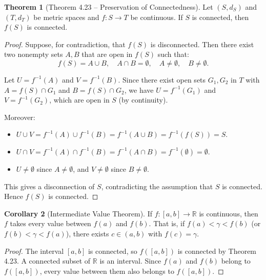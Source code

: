 \documentclass[12pt,a4paper]{article}
\theoremstyle{definition}
\newtheorem{theorem}{Theorem}[section]
\newtheorem{corollary}[theorem]{Corollary}
\newcommand{\R}{\mathbb{R}}
\begin{document}
\begin{theorem}[Theorem 4.23 -- Preservation of Connectedness]
Let $(S, d_S)$ and $(T, d_T)$ be metric spaces and $f: S \to T$ be continuous. If $S$ is connected, then $f(S)$ is connected.
\end{theorem}

\begin{proof}
Suppose, for contradiction, that $f(S)$ is disconnected. Then there exist two nonempty sets $A, B$ that are open in $f(S)$ such that:
\[
    f(S) = A \cup B, \quad A \cap B = \emptyset, \quad A \neq \emptyset, \quad B \neq \emptyset.
\]

Let $U = f^{-1}(A)$ and $V = f^{-1}(B)$. Since there exist open sets $G_1, G_2$ in $T$ with $A = f(S) \cap G_1$ and $B = f(S) \cap G_2$, we have $U = f^{-1}(G_1)$ and $V = f^{-1}(G_2)$, which are open in $S$ (by continuity).

Moreover:
\begin{itemize}
    \item $U \cup V = f^{-1}(A) \cup f^{-1}(B) = f^{-1}(A \cup B) = f^{-1}(f(S)) = S$.
    \item $U \cap V = f^{-1}(A) \cap f^{-1}(B) = f^{-1}(A \cap B) = f^{-1}(\emptyset) = \emptyset$.
    \item $U \neq \emptyset$ since $A \neq \emptyset$, and $V \neq \emptyset$ since $B \neq \emptyset$.
\end{itemize}
This gives a disconnection of $S$, contradicting the assumption that $S$ is connected. Hence $f(S)$ is connected.
\end{proof}

\begin{corollary}[Intermediate Value Theorem]
If $f: [a,b] \to \R$ is continuous, then $f$ takes every value between $f(a)$ and $f(b)$. That is, if $f(a) < \gamma < f(b)$ \textup{(}or $f(b) < \gamma < f(a)$\textup{)}, there exists $c \in (a,b)$ with $f(c) = \gamma$.
\end{corollary}

\begin{proof}
The interval $[a,b]$ is connected, so $f([a,b])$ is connected by Theorem 4.23. A connected subset of $\R$ is an interval. Since $f(a)$ and $f(b)$ belong to $f([a,b])$, every value between them also belongs to $f([a,b])$.
\end{proof}

\newpage
\end{document}
